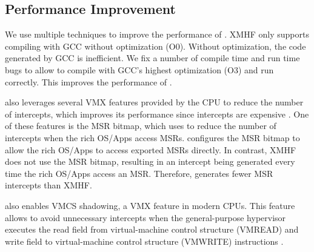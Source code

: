 \subsection{Performance Improvement}
\label{sec:impl_performance}

We use multiple techniques to improve the performance of . XMHF only supports compiling with GCC without optimization (O0). Without optimization, the code generated by GCC is inefficient. We fix a number of compile time and run time bugs to allow  to compile with GCC's highest optimization (O3) and run correctly. This improves the performance of .

 also leverages several VMX features provided by the CPU to reduce the number of intercepts, which improves its performance since intercepts are expensive \cite{agesen2012software}. One of these features is the MSR bitmap, which  uses to reduce the number of intercepts when the rich OS/Apps access MSRs.  configures the MSR bitmap to allow the rich OS/Apps to access exported MSRs directly. In contrast, XMHF does not use the MSR bitmap, resulting in an intercept being generated every time the rich OS/Apps access an MSR. Therefore,  generates fewer MSR intercepts than XMHF.

 also enables VMCS shadowing, a VMX feature in modern CPUs. This feature allows  to avoid unnecessary intercepts when the general-purpose hypervisor executes the read field from virtual-machine control structure (VMREAD) and write field to virtual-machine control structure (VMWRITE) instructions \cite{intel_vmcs_shadowing}.

